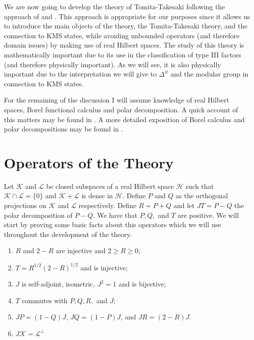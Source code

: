 We are now going to develop the theory of Tomita-Takesaki following the approach of \cite{Duvenhage1999} and \cite{Rieffel1977}. This approach is appropriate for our purposes since it allows us to introduce the main objects of the theory, the Tomita-Takesaki theory, and the connection to KMS states, while avoiding unbounded operators (and therefore domain issues) by making use of real Hilbert spaces. The study of this theory is mathematically important due to its use in the classification of type III factors (and therefore physically important). As we will see, it is also physically important due to the interpretation we will give to $\Delta^{it}$ and the modular group in connection to KMS states.

For the remaining of the discussion I will assume knowledge of real Hilbert spaces, Borel functional calculus and polar decomposition. A quick account of this matters may be found in \cite{Duvenhage1999}. A more detailed exposition of Borel calculus and polar decompositions may be found in \cite{Rudin1991}.

\section{Operators of the Theory}

Let $\mathcal{K}$ and $\mathcal{L}$ be closed subspaces of a real Hilbert space $\mathcal{H}$ such that $\mathcal{K}\cap\mathcal{L}=\{0\}$ and $\mathcal{K}+\mathcal{L}$ is dense in $\mathcal{H}$. Define $P$ and $Q$ as the orthogonal projections on $\mathcal{K}$ and $\mathcal{L}$ respectively. Define $R=P+Q$ and let $JT=P-Q$ the polar decomposition of $P-Q$. We have that $P,Q,$ and $T$ are positive. We will start by proving some basic facts about this operators which we will use throughout the development of the theory.

\begin{theorem}
\begin{enumerate}
\item $R$ and $2-R$ are injective and $2\geq R \geq 0$;
\item $T=R^{1/2}(2-R)^{1/2}$ and is injective;
\item $J$ is self-adjoint, isometric, $J^2=1$ and is bijective;
\item $T$ commutes with $P,Q,R,$ and $J$;
\item $JP=(1-Q)J$, $JQ=(1-P)J$, and $JR=(2-R)J$.
\item $J\mathcal{K}=\mathcal{L}^\bot$
\end{enumerate}
\end{theorem}


